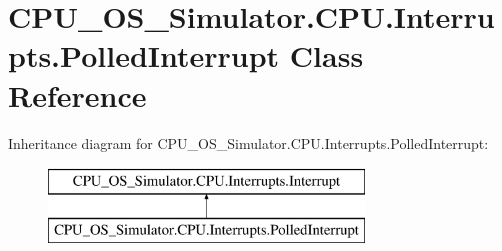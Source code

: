 \hypertarget{class_c_p_u___o_s___simulator_1_1_c_p_u_1_1_interrupts_1_1_polled_interrupt}{}\section{C\+P\+U\+\_\+\+O\+S\+\_\+\+Simulator.\+C\+P\+U.\+Interrupts.\+Polled\+Interrupt Class Reference}
\label{class_c_p_u___o_s___simulator_1_1_c_p_u_1_1_interrupts_1_1_polled_interrupt}
Inheritance diagram for C\+P\+U\+\_\+\+O\+S\+\_\+\+Simulator.\+C\+P\+U.\+Interrupts.\+Polled\+Interrupt\+:\begin{figure}[H]
\begin{center}
\leavevmode
\includegraphics[height=2.000000cm]{class_c_p_u___o_s___simulator_1_1_c_p_u_1_1_interrupts_1_1_polled_interrupt}
\end{center}
\end{figure}
